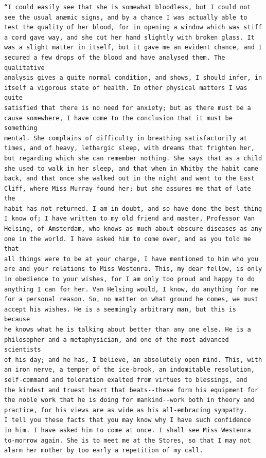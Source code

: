 \documentclass{article}
\begin{document}
\begin{verbatim}
“I could easily see that she is somewhat bloodless, but I could not
see the usual anæmic signs, and by a chance I was actually able to
test the quality of her blood, for in opening a window which was stiff
a cord gave way, and she cut her hand slightly with broken glass. It
was a slight matter in itself, but it gave me an evident chance, and I
secured a few drops of the blood and have analysed them. The qualitative
analysis gives a quite normal condition, and shows, I should infer, in
itself a vigorous state of health. In other physical matters I was quite
satisfied that there is no need for anxiety; but as there must be a
cause somewhere, I have come to the conclusion that it must be something
mental. She complains of difficulty in breathing satisfactorily at
times, and of heavy, lethargic sleep, with dreams that frighten her,
but regarding which she can remember nothing. She says that as a child
she used to walk in her sleep, and that when in Whitby the habit came
back, and that once she walked out in the night and went to the East
Cliff, where Miss Murray found her; but she assures me that of late the
habit has not returned. I am in doubt, and so have done the best thing
I know of; I have written to my old friend and master, Professor Van
Helsing, of Amsterdam, who knows as much about obscure diseases as any
one in the world. I have asked him to come over, and as you told me that
all things were to be at your charge, I have mentioned to him who you
are and your relations to Miss Westenra. This, my dear fellow, is only
in obedience to your wishes, for I am only too proud and happy to do
anything I can for her. Van Helsing would, I know, do anything for me
for a personal reason. So, no matter on what ground he comes, we must
accept his wishes. He is a seemingly arbitrary man, but this is because
he knows what he is talking about better than any one else. He is a
philosopher and a metaphysician, and one of the most advanced scientists
of his day; and he has, I believe, an absolutely open mind. This, with
an iron nerve, a temper of the ice-brook, an indomitable resolution,
self-command and toleration exalted from virtues to blessings, and
the kindest and truest heart that beats--these form his equipment for
the noble work that he is doing for mankind--work both in theory and
practice, for his views are as wide as his all-embracing sympathy.
I tell you these facts that you may know why I have such confidence
in him. I have asked him to come at once. I shall see Miss Westenra
to-morrow again. She is to meet me at the Stores, so that I may not
alarm her mother by too early a repetition of my call.


\end{verbatim}
\end{document}
